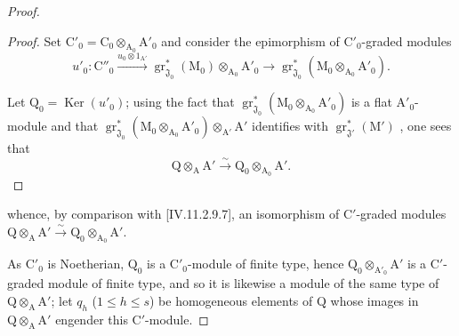 \begin{proof}
\begin{proof}
Set $\mathrm{C}'_0=\mathrm{C}_0\otimes_{\mathrm{A}_0}\mathrm{A}'_0$ and consider the epimorphism of $\mathrm{C}'_0$-graded modules
\[
  u'_0:\mathrm{C}''_0\xrightarrow{u_0\otimes 1_{\mathrm{A}'}}\operatorname{gr}^*_{\mathfrak{J}_0}(\mathrm{M}_0)\otimes_{\mathrm{A}_0}\mathrm{A}'_0\to\operatorname{gr}^*_{\mathfrak{J}_0}(\mathrm{M}_0\otimes_{\mathrm{A}_0}\mathrm{A}'_0).
\]

Let $\mathrm{Q}_0=\operatorname{Ker}(u'_0)$; using the fact that $\operatorname{gr}^*_{\mathfrak{J}_0}(\mathrm{M}_0\otimes_{\mathrm{A}_0}\mathrm{A}'_0)$ is a flat $\mathrm{A}'_0$-module and that $\operatorname{gr}^*_{\mathfrak{J}_0}(\mathrm{M}_0\otimes_{\mathrm{A}_0}\mathrm{A}'_0)\otimes_{\mathrm{A}'}\mathrm{A}'$ identifies with $\operatorname{gr}^*_{\mathfrak{J}'}(\mathrm{M}')$ , one sees that
\begin{equation}
  \mathrm{Q}\otimes_\mathrm{A}\mathrm{A}'\xrightarrow{\sim}\mathrm{Q}_0\otimes_{\mathrm{A}_0}\mathrm{A}'.
  \tag{11.2.9.8}
\end{equation}
\end{proof}


whence, by comparison with [IV.11.2.9.7], an isomorphism of $\mathrm{C}'$-graded modules $\mathrm{Q}\otimes_\mathrm{A}\mathrm{A}'\xrightarrow{\sim}\mathrm{Q}_0\otimes_{\mathrm{A}_0}\mathrm{A}'$.

As $\mathrm{C}'_0$ is Noetherian, $\mathrm{Q}_0$ is a $\mathrm{C}'_0$-module of finite type, hence $\mathrm{Q}_0\otimes_{\mathrm{A}'_0}\mathrm{A}'$ is a $\mathrm{C}'$-graded module of finite type, and so it is likewise a module of the same type of $\mathrm{Q}\otimes_\mathrm{A}\mathrm{A}'$; let $q_h$ ($1\leqslant h\leqslant s$) be homogeneous elements of $\mathrm{Q}$ whose images in $\mathrm{Q}\otimes_\mathrm{A}\mathrm{A}'$ engender this $\mathrm{C}'$-module.


\end{proof}

